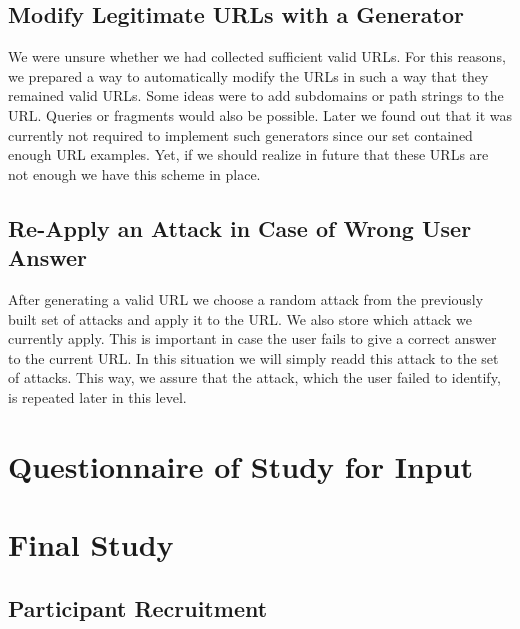 \subsection{Modify Legitimate URLs with a Generator}
\label{s:apply_generator}
We were unsure whether we had collected sufficient valid URLs.
 For this reasons, we prepared a way to automatically modify the URLs in such a way that they remained valid URLs. 
Some ideas were to add subdomains or path strings to the URL. Queries or fragments would also  be possible. 
Later we found out that it was currently not required to implement such generators since our set contained enough URL examples. 
Yet, if we should realize in future that these URLs are not enough we have this scheme in place.
\subsection{Re-Apply an Attack in Case of Wrong User Answer}
After generating a valid URL we choose a random attack from the previously built set of attacks and apply it to the URL. We also store which attack we currently apply. This is important in case  the user fails to give a correct answer to the current URL. In this situation we will simply readd this attack to the set of attacks.
This way, we assure that the attack, which the user failed to identify, is repeated later in this level.

\section{Questionnaire of Study for Input}
\label{s:presurvey_form}



\section{Final Study}

\subsection{Participant Recruitment}
\label{s:participant_recruitment_texts}

